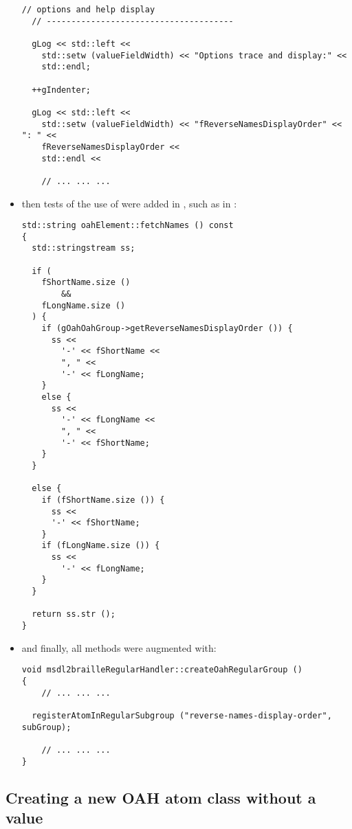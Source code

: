 \begin{itemize}
\begin{lstlisting}[language=CPlusPlus]
  // options and help display
  // --------------------------------------

  gLog << std::left <<
    std::setw (valueFieldWidth) << "Options trace and display:" <<
    std::endl;

  ++gIndenter;

  gLog << std::left <<
    std::setw (valueFieldWidth) << "fReverseNamesDisplayOrder" << ": " <<
    fReverseNamesDisplayOrder <<
    std::endl <<

	// ... ... ...
\end{lstlisting}

\item then tests of the use of  were added in , such as in :
\begin{lstlisting}[language=CPlusPlus]
std::string oahElement::fetchNames () const
{
  std::stringstream ss;

  if (
    fShortName.size ()
        &&
    fLongName.size ()
  ) {
    if (gOahOahGroup->getReverseNamesDisplayOrder ()) {
      ss <<
        '-' << fShortName <<
        ", " <<
        '-' << fLongName;
    }
    else {
      ss <<
        '-' << fLongName <<
        ", " <<
        '-' << fShortName;
    }
  }

  else {
    if (fShortName.size ()) {
      ss <<
      '-' << fShortName;
    }
    if (fLongName.size ()) {
      ss <<
        '-' << fLongName;
    }
  }

  return ss.str ();
}
\end{lstlisting}

\item and finally, all  methods were augmented with:
\begin{lstlisting}[language=CPlusPlus]
 void msdl2brailleRegularHandler::createOahRegularGroup ()
{
	// ... ... ...

  registerAtomInRegularSubgroup ("reverse-names-display-order", subGroup);

	// ... ... ...
}
\end{lstlisting}

\end{itemize}


\subsection{Creating a new OAH atom class   without a value}

